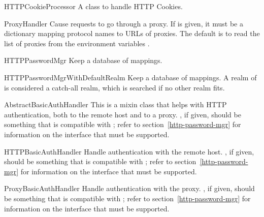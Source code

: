 \begin{classdesc}{HTTPCookieProcessor}{}
A class to handle HTTP Cookies.
\end{classdesc}

\begin{classdesc}{ProxyHandler}{}
Cause requests to go through a proxy.
If  is given, it must be a dictionary mapping
protocol names to URLs of proxies.
The default is to read the list of proxies from the environment
variables .
\end{classdesc}

\begin{classdesc}{HTTPPasswordMgr}{}
Keep a database of 
mappings.
\end{classdesc}

\begin{classdesc}{HTTPPasswordMgrWithDefaultRealm}{}
Keep a database of 
 mappings.
A realm of  is considered a catch-all realm, which is searched
if no other realm fits.
\end{classdesc}

\begin{classdesc}{AbstractBasicAuthHandler}{}
This is a mixin class that helps with HTTP authentication, both
to the remote host and to a proxy.
, if given, should be something that is compatible
with ; refer to section~\ref{http-password-mgr}
for information on the interface that must be supported.
\end{classdesc}

\begin{classdesc}{HTTPBasicAuthHandler}{}
Handle authentication with the remote host.
, if given, should be something that is compatible
with ; refer to section~\ref{http-password-mgr}
for information on the interface that must be supported.
\end{classdesc}

\begin{classdesc}{ProxyBasicAuthHandler}{}
Handle authentication with the proxy.
, if given, should be something that is compatible
with ; refer to section~\ref{http-password-mgr}
for information on the interface that must be supported.
\end{classdesc}

